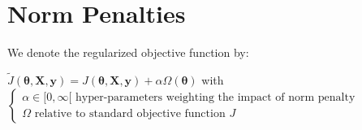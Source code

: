 \section{Norm Penalties}
We denote the regularized objective function by:
\begin{center}
    $\tilde{J}(\bm{\theta}, \bm{X}, \bm{y}) = J(\bm{\theta}, \bm{X}, \bm{y}) +
    \alpha\Omega(\bm{\theta})$ with
    $\begin{cases}
        \alpha\in[0,\infty[\text{ hyper-parameters weighting the impact of norm
        penalty}\\
        \Omega\text{ relative to standard objective function }J
    \end{cases}$
\end{center}




